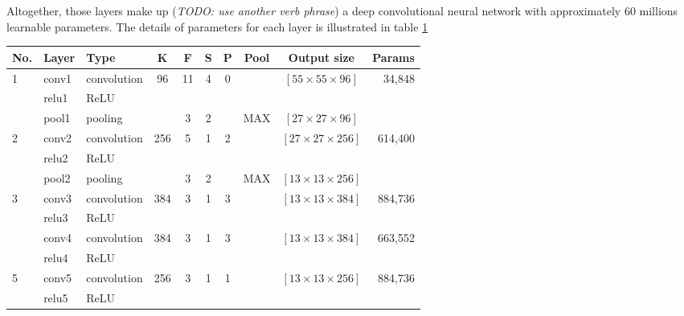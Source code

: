 Altogether, those layers make up (\textit{TODO: use another verb phrase}) a deep convolutional neural network with approximately 60 millions learnable parameters. The details of parameters for each layer is illustrated in table \ref{tab:alexnet-params}

\begin{table}
	\centering
       \label{tab:alexnet-params}
       \begin{tabular}{|l|l|l|c|c|c|c|c|c|r|} \hline
              \textbf{No.} & \textbf{Layer} & \textbf{Type} & \textbf{K} & \textbf{F} & \textbf{S} & \textbf{P} & \textbf{Pool} & \textbf{Output size} & \textbf{Params} \\ \hline
              \multirow{3}{*}{1} & conv1 & convolution & 96 & 11 & 4 & 0 & & $\left[ 55 \times 55 \times 96 \right]$ & 34,848 \\ \cline{2-10}
                          & relu1 & ReLU & & & & & & &  \\ \cline{2-10}
                          & pool1 & pooling & & 3 & 2 & & MAX & $\left[ 27 \times 27 \times 96 \right]$ & \\ \hline
              \multirow{3}{*}{2} & conv2 & convolution & 256 & 5 & 1 & 2 & & $\left[ 27 \times 27 \times 256 \right]$ & 614,400\\ \cline{2-10}
                          & relu2 & ReLU & & & & & & &\\ \cline{2-10}
                          & pool2 & pooling & & 3 & 2 & & MAX & $\left[ 13 \times 13 \times 256 \right]$ & \\ \hline
              \multirow{3}{*}{3} & conv3 & convolution & 384 & 3 & 1 & 3 & & $\left[ 13 \times 13 \times 384 \right]$ & 884,736 \\ \cline{2-10}
                          & relu3 & ReLU & & & & & & & \\ \hline
              \multirow{2}{*}{4} & conv4 & convolution & 384 & 3 & 1 & 3 & & $\left[ 13 \times 13 \times 384 \right]$ & 663,552\\ \cline{2-10}
                          & relu4 & ReLU & & & & & & & \\ \hline
              \multirow{3}{*}{5} & conv5 & convolution & 256 & 3 & 1 & 1 & & $\left[ 13 \times 13 \times 256 \right]$ & 884,736 \\ \cline{2-10}
                          & relu5 & ReLU & & & & & & & \\ \cline{2-10}

\end{tabular}
\end{table}
